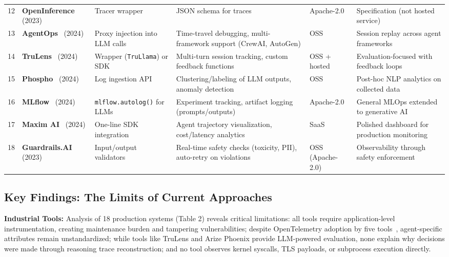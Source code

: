 \documentclass[sigplan,screen,9pt]{acmart}
\begin{document}
\begin{table*}[t]
\begin{tabular}{p{0.5cm} p{2.2cm} p{2.3cm} p{2.8cm} p{1.8cm} p{2.5cm}}
12 & \textbf{OpenInference}~\cite{openinference} (2023) & Tracer wrapper & JSON schema for traces & Apache-2.0 & Specification (not hosted service) \\
13 & \textbf{AgentOps}~\cite{agentops-tool} (2024) & Proxy injection into LLM calls & Time-travel debugging, multi-framework support (CrewAI, AutoGen) & OSS & Session replay across agent frameworks \\
14 & \textbf{TruLens}~\cite{trulens} (2024) & Wrapper (\texttt{TruLlama}) or SDK & Multi-turn session tracking, custom feedback functions & OSS + hosted & Evaluation-focused with feedback loops \\
15 & \textbf{Phospho}~\cite{phospho} (2024) & Log ingestion API & Clustering/labeling of LLM outputs, anomaly detection & OSS & Post-hoc NLP analytics on collected data \\
16 & \textbf{MLflow}~\cite{mlflow-genai} (2024) & \texttt{mlflow.autolog()} for LLMs & Experiment tracking, artifact logging (prompts/outputs) & Apache-2.0 & General MLOps extended to generative AI \\
17 & \textbf{Maxim AI}~\cite{maxim-ai} (2024) & One-line SDK integration & Agent trajectory visualization, cost/latency analytics & SaaS & Polished dashboard for production monitoring \\
18 & \textbf{Guardrails.AI}~\cite{guardrails-ai} (2023) & Input/output validators & Real-time safety checks (toxicity, PII), auto-retry on violations & OSS (Apache-2.0) & Observability through safety enforcement \\
\bottomrule
\end{tabular}
\end{table*}

\subsection{Key Findings: The Limits of Current Approaches}

\textbf{Industrial Tools:} Analysis of 18 production systems (Table 2) reveals critical limitations: all tools require application-level instrumentation, creating maintenance burden and tampering vulnerabilities; despite OpenTelemetry adoption by five tools~\cite{Liu2025OTel}, agent-specific attributes remain unstandardized; while tools like TruLens and Arize Phoenix provide LLM-powered evaluation, none explain why decisions were made through reasoning trace reconstruction; and no tool observes kernel syscalls, TLS payloads, or subprocess execution directly.
\end{document}
